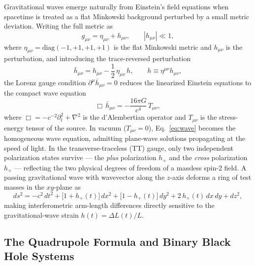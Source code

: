 Gravitational waves emerge naturally from Einstein's field equations when spacetime is treated as
a flat Minkowski background perturbed by a small metric deviation. Writing the full metric as
\begin{equation}
	g_{\mu\nu} = \eta_{\mu\nu} + h_{\mu\nu}, \qquad |h_{\mu\nu}| \ll 1,
\end{equation}
where $\eta_{\mu\nu} = \mathrm{diag}(-1,+1,+1,+1)$ is the flat Minkowski metric and $h_{\mu\nu}$
is the perturbation, and introducing the trace-reversed perturbation
\begin{equation}
	\bar{h}_{\mu\nu} = h_{\mu\nu} - \frac{1}{2}\,\eta_{\mu\nu}\, h, \qquad
	h \equiv \eta^{\mu\nu}h_{\mu\nu},
\end{equation}
the Lorenz gauge condition $\partial^{\mu}\bar{h}_{\mu\nu} = 0$ reduces the linearized Einstein
equations to the compact wave equation
\begin{equation}
	\Box\,\bar{h}_{\mu\nu} = -\frac{16\pi G}{c^{4}}\,T_{\mu\nu},
	\label{eq:wave}
\end{equation}
where $\Box = -c^{-2}\partial_t^2 + \nabla^2$ is the d'Alembertian operator and $T_{\mu\nu}$ is
the stress-energy tensor of the source. In vacuum ($T_{\mu\nu}=0$), Eq.~\eqref{eq:wave} becomes
the homogeneous wave equation, admitting plane-wave solutions propagating at the speed of light.
In the transverse-traceless (TT) gauge, only two independent polarization states survive --- the
\emph{plus} polarization $h_{+}$ and the \emph{cross} polarization $h_{\times}$ --- reflecting the
two physical degrees of freedom of a massless spin-2 field. A passing gravitational wave with
wavevector along the $z$-axis deforms a ring of test masses in the $xy$-plane as
\begin{equation}
	ds^2 = -c^2\,dt^2 + \bigl[1 + h_+(t)\bigr]\,dx^2
	+ \bigl[1 - h_+(t)\bigr]\,dy^2
	+ 2\,h_\times(t)\,dx\,dy + dz^2,
\end{equation}
making interferometric arm-length differences directly sensitive to the gravitational-wave strain
$h(t) = \Delta L(t)/L$.

\subsection*{The Quadrupole Formula and Binary Black Hole Systems}

